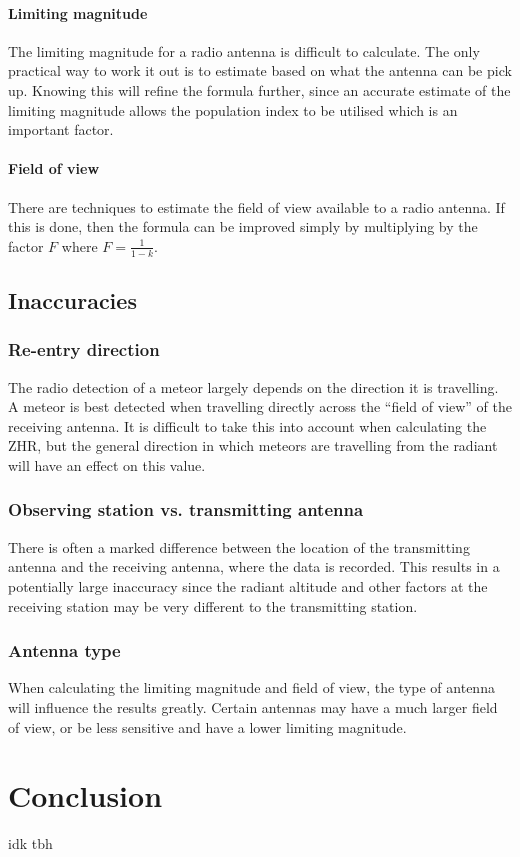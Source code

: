 \paragraph{Limiting magnitude\\}
The limiting magnitude for a radio antenna is difficult to calculate. The only practical way to work it out is to estimate based on what the antenna can be pick up. Knowing this will refine the formula further, since an accurate estimate of the limiting magnitude allows the population index to be utilised which is an important factor.
\paragraph{Field of view\\}
There are techniques to estimate the field of view available to a radio antenna. If this is done, then the formula can be improved simply by multiplying by the factor $F$ where $F = \frac{1}{1-k}$.
\subsection{Inaccuracies}
\subsubsection{Re-entry direction}
The radio detection of a meteor largely depends on the direction it is travelling. A meteor is best detected when travelling directly across the ``field of view'' of the receiving antenna. It is difficult to take this into account when calculating the ZHR, but the general direction in which meteors are travelling from the radiant will have an effect on this value.
\subsubsection{Observing station vs. transmitting antenna}
There is often a marked difference between the location of the transmitting antenna and the receiving antenna, where the data is recorded. This results in a potentially large inaccuracy since the radiant altitude and other factors at the receiving station may be very different to the transmitting station.
\subsubsection{Antenna type}
When calculating the limiting magnitude and field of view, the type of antenna will influence the results greatly. Certain antennas may have a much larger field of view, or be less sensitive and have a lower limiting magnitude. 
\section{Conclusion}
idk tbh